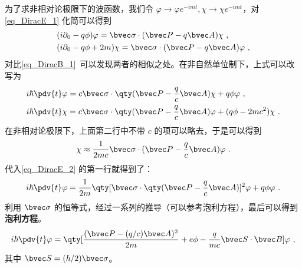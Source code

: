 为了求非相对论极限下的波函数，我们令 $\varphi\rightarrow \varphi e^{-imt},\chi\rightarrow \chi e^{-imt}$，对 \autoref{eq_DiracE_1} 化简可以得到
\begin{equation}\label{eq_DiracE_5}
\begin{aligned}
&(i\partial_0 - q \phi)\varphi = \bvec \sigma\cdot (\bvec P-q\bvec A) \chi~,\\
&(i\partial_0 - q \phi + 2m) \chi = \bvec \sigma\cdot (\bvec P-q\bvec A)  \varphi~,
\end{aligned}
\end{equation}
对比\autoref{eq_DiracB_1}~可以发现两者的相似之处。在非自然单位制下，上式可以改写为
\begin{equation}\label{eq_DiracE_2}
\begin{aligned}
&i\hbar \pdv{t} \varphi = c\bvec \sigma\cdot \qty(\bvec P-\frac{q}{c}\bvec A)\chi + q \phi \varphi~,\\
&i\hbar\pdv{t} \chi = c \bvec \sigma\cdot \qty(\bvec P-\frac{q}{c}\bvec A) \varphi + (q \phi-2mc^2) \chi~.
\end{aligned}
\end{equation}
在非相对论极限下，上面第二行中不带 $c$ 的项可以略去，于是可以得到
\begin{equation}
\chi\approx \frac{1}{2mc} \bvec \sigma \cdot(\bvec P-\frac{q}{c}\bvec A)\varphi~.
\end{equation}
代入\autoref{eq_DiracE_2} 的第一行就得到了：
\begin{equation}
i\hbar\pdv{t} \varphi = \frac{1}{2m}\qty[\bvec \sigma \cdot\qty(\bvec P - \frac{q}{c}\bvec A)]^2 \varphi + q\phi  \varphi~.
\end{equation}
利用 $\bvec \sigma$ 的恒等式，经过一系列的推导（可以参考泡利方程），最后可以得到\textbf{泡利方程}。
\begin{equation}
i\hbar\pdv{t} \varphi = \qty[\frac{(\bvec P - (q/c)\bvec A)^2}{2m}+e\phi-\frac{q}{mc}\bvec S\cdot \bvec B]\varphi~,
\end{equation}
其中 $\bvec S=(\hbar/2)\bvec \sigma$。